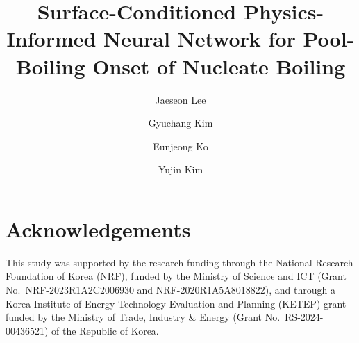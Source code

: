 \documentclass[review,1p,12pt,a4paper]{elsarticle}
\begin{document}
\begin{frontmatter}

\title{Surface-Conditioned Physics-Informed Neural Network
       for Pool-Boiling Onset of Nucleate Boiling}

\author[unist]{Jaeseon Lee}
\author[unist]{Gyuchang Kim}
\author[unist]{Eunjeong Ko}
\author[unist]{Yujin Kim}


\address[unist]{Innovative Thermal Engineering Laboratory,
Department of Mechanical Engineering,
Ulsan National Institute of Science and Technology,
50 UNIST Rd., Ulsan 44919, Republic of Korea}





\end{frontmatter}









\section*{Acknowledgements}
This study was supported by the research funding through the National
Research Foundation of Korea (NRF), funded by the Ministry of Science and
ICT (Grant No.\ NRF-2023R1A2C2006930 and NRF-2020R1A5A8018822), and through
a Korea Institute of Energy Technology Evaluation and Planning (KETEP)
grant funded by the Ministry of Trade, Industry \& Energy (Grant No.\
RS-2024-00436521) of the Republic of Korea.

\end{document}
